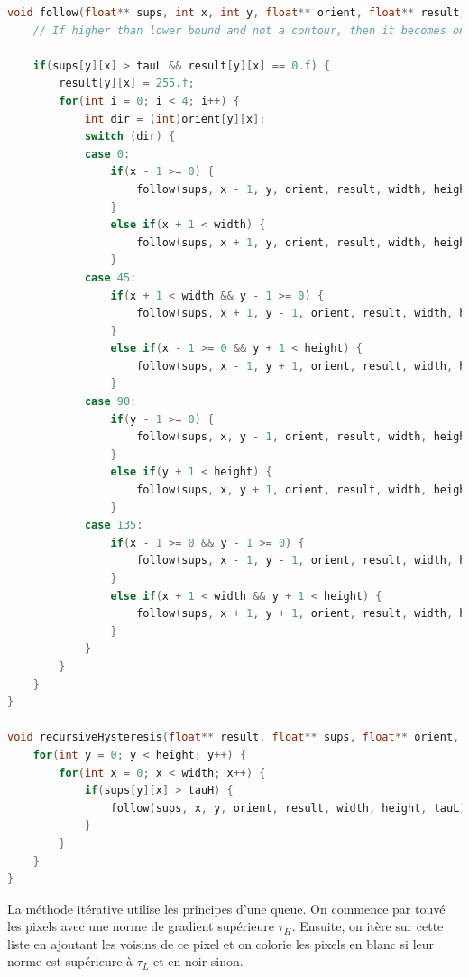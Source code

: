 \documentclass{article}
\begin{document}
\begin{lstlisting}[language=C]
    void follow(float** sups, int x, int y, float** orient, float** result, int width, int height, float tauL) {
    // If higher than lower bound and not a contour, then it becomes one

    if(sups[y][x] > tauL && result[y][x] == 0.f) {
        result[y][x] = 255.f;
        for(int i = 0; i < 4; i++) {
            int dir = (int)orient[y][x];
            switch (dir) {
            case 0:
                if(x - 1 >= 0) {
                    follow(sups, x - 1, y, orient, result, width, height, tauL);
                }
                else if(x + 1 < width) {
                    follow(sups, x + 1, y, orient, result, width, height, tauL);
                }
            case 45:
                if(x + 1 < width && y - 1 >= 0) {
                    follow(sups, x + 1, y - 1, orient, result, width, height, tauL);
                }
                else if(x - 1 >= 0 && y + 1 < height) {
                    follow(sups, x - 1, y + 1, orient, result, width, height, tauL);
                }
            case 90:
                if(y - 1 >= 0) {
                    follow(sups, x, y - 1, orient, result, width, height, tauL);
                }
                else if(y + 1 < height) {
                    follow(sups, x, y + 1, orient, result, width, height, tauL);
                }
            case 135:
                if(x - 1 >= 0 && y - 1 >= 0) {
                    follow(sups, x - 1, y - 1, orient, result, width, height, tauL);
                }
                else if(x + 1 < width && y + 1 < height) {
                    follow(sups, x + 1, y + 1, orient, result, width, height, tauL);
                }
            }
        }
    }
}

void recursiveHysteresis(float** result, float** sups, float** orient, int width, int height, float tauL, float tauH) {
    for(int y = 0; y < height; y++) {
        for(int x = 0; x < width; x++) {
            if(sups[y][x] > tauH) {
                follow(sups, x, y, orient, result, width, height, tauL);
            }
        }
    }
}
\end{lstlisting}
La méthode itérative utilise les principes d'une queue. On commence par touvé les pixels avec une norme de gradient supérieure $\tau_H$. Ensuite, on itère
sur cette liste en ajoutant les voisins de ce pixel et on colorie les pixels en blanc si leur norme est supérieure à $\tau_L$ et en noir sinon.
\end{document}
